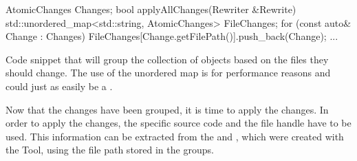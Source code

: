 \begin{listing}[H]
    \begin{cppcode}
AtomicChanges Changes;
bool applyAllChanges(Rewriter &Rewrite) {
    std::unordered_map<std::string, AtomicChanges> FileChanges;
    for (const auto& Change : Changes) {
        FileChanges[Change.getFilePath()].push_back(Change);
    }
    ...
}
    \end{cppcode}
    \caption{Code snippet that will group the collection of  objects based on the files they should change. The use of the unordered map is for performance reasons and could just as easily be a .}
    \label{code:085tool_ex:030cstyle:SortChanges}
\end{listing}

Now that the changes have been grouped, it is time to apply the changes. In order to apply the changes, the specific source code and the file handle have to be used. This information can be extracted from the  and , which were created with the Tool, using the file path stored in the groups. 





